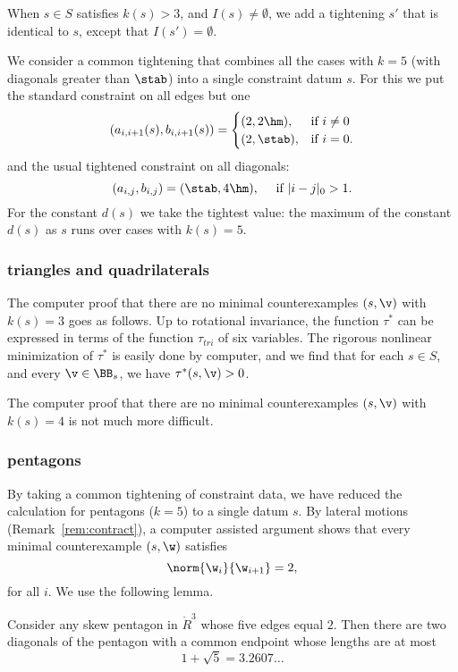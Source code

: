 When $s\in S$ satisfies $k(s)>3$, and $I(s)\ne\emptyset$, we add a
tightening $s'$ that is identical to $s$, except that
$I(s')=\emptyset$.

We consider a common tightening that combines all the cases with $k=5$
(with diagonals greater than $\stab$) into a single constraint datum
$s$.  For this we put the standard constraint on all edges but one
\[
(a_{i,i+1}(s),b_{i,i+1}(s))=
\begin{cases}
(2,2\hm),&\text{if } i\ne 0\\
(2,\stab),&\text{if } i=0.
\end{cases}
\]
and the usual tightened constraint on all diagonals:
\[
(a_{i,j},b_{i,j})=(\stab,4\hm),\quad \text{ if } |i-j|_0>1.
\]
For the constant $d(s)$ we take the tightest value: the maximum of
the constant $d(s)$ as $s$ runs over cases with $k(s)=5$.


\subsubsection{triangles and quadrilaterals}

The computer proof that there are no minimal counterexamples $(s,\v)$
with $k(s)=3$ goes as follows.  Up to rotational invariance, the function
$\tau^*$ can be expressed in terms of the function $\tau_{tri}$ of six
variables.  The rigorous nonlinear minimization of $\tau^*$ is easily done
by computer, and we find that for each $s\in S$, and every $\v\in \BB_s$,
we have $\tau^*(s,\v)>0$.

The computer proof that there are no minimal counterexamples $(s,\v)$
with $k(s)=4$ is not much more difficult.

\subsubsection{pentagons}

By taking a common tightening of constraint data, we have reduced the
calculation for pentagons ($k=5$) to a single datum $s$.   
By lateral motions  (Remark~\ref{rem:contract}), 
a computer assisted argument shows that every minimal
counterexample $(s,\w)$ satisfies
\[
\norm{\w_i}{\w_{i+1}} = 2,
\]
for all $i$.  We use the following lemma.

\begin{lemma}
Consider any skew pentagon in $\ring{R}^3$ whose five edges equal $2$.
Then there are two  diagonals  of the pentagon with a common
endpoint whose lengths  are at most
\[
1 + \sqrt{5} = 3.2607\ldots
\]
\end{lemma}

